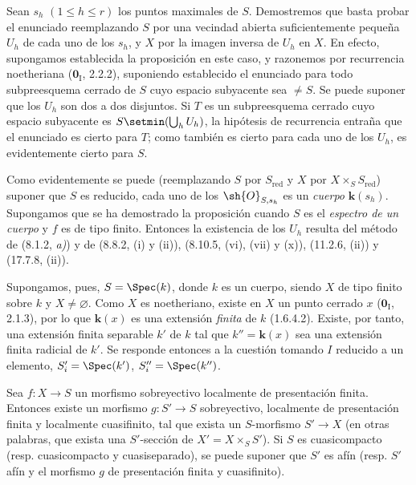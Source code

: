Sean $s_h$ $(1\leq h\leq r)$ los puntos maximales de $S$. Demostremos que basta probar el enunciado reemplazando $S$ por una vecindad abierta suficientemente pequeña $U_h$ de cada uno de los $s_h$, y $X$ por la imagen inversa de $U_h$ en $X$. En efecto, supongamos establecida la proposición en este caso, y razonemos por recurrencia noetheriana ($\mathbf{0}_{\mathrm I}$, 2.2.2), suponiendo establecido el enunciado para todo subpreesquema cerrado de $S$ cuyo espacio subyacente sea $\neq S$. Se puede suponer que los $U_h$ son dos a dos disjuntos. Si $T$ es un subpreesquema cerrado cuyo espacio subyacente es $S\setmin(\bigcup_h U_h)$, la hipótesis de recurrencia entraña que el enunciado es cierto para $T$; como también es cierto para cada uno de los $U_h$, es evidentemente cierto para $S$.

Como evidentemente se puede (reemplazando $S$ por $S_{\mathrm{red}}$ y $X$ por $X\times_S S_{\mathrm{red}}$) suponer que $S$ es reducido, cada uno de los $\sh{O}_{S,s_h}$ es un \emph{cuerpo} $\boldsymbol{k}(s_h)$. Supongamos que se ha demostrado la proposición cuando $S$ es el \emph{espectro de un cuerpo} y $f$ es de tipo finito. Entonces la existencia de los $U_h$ resulta del método de (8.1.2, \emph{a)}) y de (8.8.2, (i) y (ii)), (8.10.5, (vi), (vii) y (x)), (11.2.6, (ii)) y (17.7.8, (ii)).

Supongamos, pues, $S=\Spec(k)$, donde $k$ es un cuerpo, siendo $X$ de tipo finito sobre $k$ y $X\neq\varnothing$. Como $X$ es noetheriano, existe en $X$ un punto cerrado $x$ ($\mathbf{0}_{\mathrm I}$, 2.1.3), por lo que $\boldsymbol{k}(x)$ es una extensión \emph{finita} de $k$ (1.6.4.2). Existe, por tanto, una extensión finita separable $k'$ de $k$ tal que $k''=\boldsymbol{k}(x)$ sea una extensión finita radicial de $k'$. Se responde entonces a la cuestión tomando $I$ reducido a un elemento, $S_i'=\Spec(k')$, $S_i''=\Spec(k'')$.


\begin{corollary}[17.16.5]
\label{IV.17.16.5}
Sea $f:X\to S$ un morfismo sobreyectivo localmente de presentación finita. Entonces existe un morfismo $g:S'\to S$ sobreyectivo, localmente de presentación finita y \textup{localmente cuasifinito}, tal que exista un $S$-morfismo $S'\to X$ \textup{(en otras palabras, que exista una} $S'$-sección \textup{de} $X'=X\times_S S'$\textup{)}. Si $S$ es cuasicompacto \textup{(resp.} cuasicompacto y cuasiseparado\textup{)}, se puede suponer que $S'$ es afín \textup{(resp.} $S'$ afín y el morfismo $g$ de presentación finita y cuasifinito\textup{)}.
\end{corollary}

